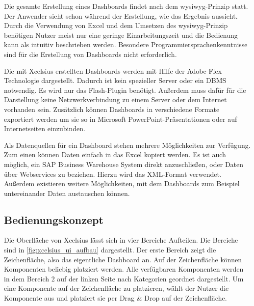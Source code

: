\begin{onehalfspacing}
Die gesamte Erstellung eines Dashboards findet nach dem \gls{wysiwyg}-Prinzip statt. Der Anwender sieht schon während der Erstellung, wie das Ergebnis aussieht. Durch die Verwendung von Excel und dem Umsetzen des \gls{wysiwyg}-Prinzip benötigen Nutzer meist nur eine geringe Einarbeitungszeit und die Bedienung kann als intuitiv beschrieben werden. Besondere Programmiersprachenkenntnisse sind für die Erstellung von Dashboards nicht erforderlich.

Die mit \gls{Xcelsius} erstellten Dashboards werden mit Hilfe der Adobe Flex Technologie dargestellt. Dadurch ist kein spezieller Server oder ein \gls{DBMS} notwendig. Es wird nur das Flash-Plugin benötigt. Außerdem muss dafür für die Darstellung keine Netzwerkverbindung zu einem Server oder dem Internet vorhanden sein.  Zusätzlich können Dashboards in verschiedene Formate exportiert werden um sie so in Microsoft PowerPoint-Präsentationen oder auf Internetseiten einzubinden.

Als Datenquellen für ein Dashboard stehen mehrere Möglichkeiten zur Verfügung. Zum einen können Daten einfach in das Excel kopiert werden.  Es ist auch möglich, ein SAP Business Warehouse System direkt anzuschließen, oder Daten über Webservices zu beziehen. Hierzu wird das \gls{XML}-Format verwendet. Außerdem existieren weitere Möglichkeiten, mit dem Dashboards zum Beispiel untereinander Daten austauschen können.

\subsection{Bedienungskonzept}
Die Oberfläche von \gls{Xcelsius} lässt sich in vier Bereiche Aufteilen. Die Bereiche sind in \vref{fig:xcelsius_ui_aufbau} dargestellt. Der erste Bereich zeigt die Zeichenfläche, also das eigentliche Dashboard an. Auf der Zeichenfläche können Komponenten beliebig platziert werden. Alle verfügbaren Komponenten werden in dem Bereich 2 auf der linken Seite nach Kategorien geordnet dargestellt. Um eine Komponente auf der Zeichenfläche zu platzieren, wählt der Nutzer die Komponente aus und platziert sie per Drag \& Drop auf der Zeichenfläche. 


\end{onehalfspacing}
